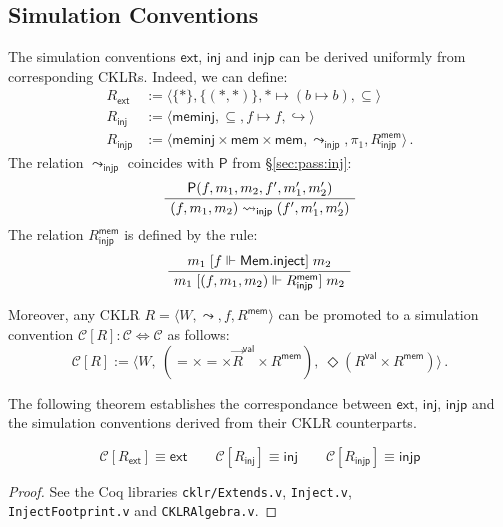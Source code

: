 \documentclass[sigplan,10pt,review,anonymous]{acmart}
\newcommand{\kw}[1]{\ensuremath{ \mathsf{#1} }}
\newcommand{\ifr}[1]{\mathrel{[{#1}]}}
\begin{document}

\subsection{Simulation Conventions} %

The simulation conventions \kw{ext}, \kw{inj} and \kw{injp}
can be derived uniformly from corresponding CKLRs.
Indeed, we can define:
\begin{align*}
  R_\kw{ext} &:= 
    \langle \{*\}, \{(*,*)\}, * \mapsto (b \mapsto b), {\subseteq} \rangle
  \\
  R_\kw{inj} &:=
    \langle \kw{meminj}, {\subseteq}, f \mapsto f, {\hookrightarrow} \rangle
  \\
  R_\kw{injp} &:=
    \langle
      \kw{meminj} \times \kw{mem} \times \kw{mem},
      \leadsto_\kw{injp}, \pi_1, R_\kw{injp}^\kw{mem}
    \rangle \,.
\end{align*}
The relation $\leadsto_\kw{injp}$
coincides with $\kw{P}$ from \S\ref{sec:pass:inj}:
\[
  \AxiomC{$\kw{P}(f, m_1, m_2, f', m_1', m_2')$}
  \UnaryInfC{$(f, m_1, m_2) \leadsto_\kw{injp} (f', m_1', m_2')$}
  \DisplayProof
\]
The relation $R_\kw{injp}^\kw{mem}$ is defined by the rule:
\[
  \AxiomC{$m_1 \ifr{f \Vdash \kw{Mem.inject}} m_2$}
  \UnaryInfC{$m_1 \ifr{(f, m_1, m_2) \Vdash R_\kw{injp}^\kw{mem}} m_2$}
  \DisplayProof
\]

Moreover, any CKLR
$R = \langle W, {\leadsto}, f, R^\kw{mem} \rangle$ can be promoted to
a simulation convention
$\mathcal{C}[R] : \mathcal{C} \Leftrightarrow \mathcal{C}$
as follows:
\[
    \mathcal{C}[R] := \langle
      W, \:
      ({=} \times {=} \times \vec{R}^\kw{val} \times R^\kw{mem}), \:
      \Diamond (R^\kw{val} \times R^\kw{mem})
    \rangle \,.
\]

The following theorem
establishes the correspondance between \kw{ext}, \kw{inj}, \kw{injp}
and the simulation conventions derived from their CKLR counterparts.

\begin{theorem}
\[
    \mathcal{C}[R_\kw{ext}] \equiv \kw{ext} \qquad
    \mathcal{C}[R_\kw{inj}] \equiv \kw{inj} \qquad
    \mathcal{C}[R_\kw{injp}] \equiv \kw{injp}
\]
\begin{proof}
See the Coq libraries \texttt{cklr/Extends.v}, \texttt{Inject.v}, \\
\texttt{InjectFootprint.v} and \texttt{CKLRAlgebra.v}.
\end{proof}
\end{theorem}
\end{document}
